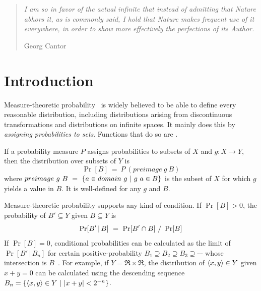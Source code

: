 \newsavebox{\codebox}

\begin{quote}
\textit{I am so in favor of the actual infinite that instead of admitting that Nature abhors it, as is commonly said, I hold that Nature makes frequent use of it everywhere, in order to show more effectively the perfections of its Author.}

\hfill Georg Cantor
\end{quote}


\section{Introduction}

Measure-theoretic probability~\cite{cit:klenke-2006-probability} is widely believed to be able to define every reasonable distribution, including distributions arising from discontinuous transformations and distributions on infinite spaces.
It mainly does this by \emph{assigning probabilities to sets}.
Functions that do so are .

If a probability measure $P$ assigns probabilities to subsets of $X$ and $g : X \to Y$, then the distribution over subsets of $Y$ is
\begin{equation}
	\Pr[B] \ = \ P~(preimage~g~B)
\end{equation}
where $preimage~g~B\ =\ \lbrace {a \in domain~g} \ \lvert\ {g~a \in B} \rbrace$ is the subset of $X$ for which $g$ yields a value in $B$.
It is well-defined for any $g$ and $B$.

Measure-theoretic probability supports any kind of condition.
If $\Pr[B] > \mathrm{0}$, the probability of $B' \subseteq Y$ given $B \subseteq Y$ is
\begin{equation}
	\Pr[B'\,|\,B]\ =\ \Pr[B' \cap B]~{/}~\Pr[B]
\label{eqn:bayes-law-preimage}
\end{equation}
If $\Pr[B] = \mathrm{0}$, conditional probabilities can be calculated as the limit of $\Pr[B'\,|\,B_n]$ for certain positive-probability $B_1 \supseteq B_2 \supseteq B_3 \supseteq \cdots$ whose intersection is $B$~\cite{cit:samuels-1978amm-radnik}.
For example, if $Y = \Re \times \Re$, the distribution of $\langle{x,y}\rangle \in Y$ given $x + y = \mathrm{0}$ can be calculated using the descending sequence $B_n = \lbrace {\langle{x,y}\rangle \in Y} \ \lvert\ {|x + y| < \mathrm{2}^{-n}} \rbrace$.

